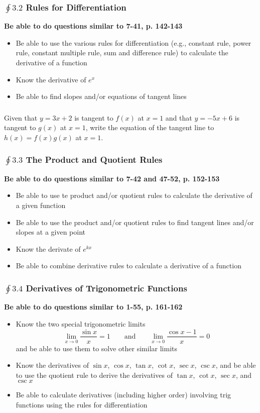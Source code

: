 \documentclass[14pt]{beamer}
\begin{document}
\begin{frame}
\frametitle{\small $\oint 3.2$ Rules for Differentiation}
\small
{\bf Be able to do questions similar to 7-41, p. 142-143}

\begin{itemize}
\item Be able to use the various rules for differentiation (e.g., constant rule, power rule, constant multiple rule, sum and difference rule) to calculate the derivative of a function
\item Know the derivative of $e^x$
\item Be able to find slopes and/or equations of tangent lines
\end{itemize}
\end{frame}

\begin{frame}
\frametitle{}
\begin{exe}
Given that $y=3x+2$ is tangent to $f(x)$ at $x=1$ and that $y=-5x+6$ is tangent to $g(x)$ at $x=1$, write the equation of the tangent line to $h(x)=f(x)g(x)$ at $x=1$.
\end{exe}
\end{frame}

\begin{frame}
\frametitle{\small $\oint 3.3$ The Product and Quotient Rules}
\small
{\bf Be able to do questions similar to 7-42 and 47-52, p. 152-153}

\begin{itemize}
\item Be able to use te product and/or quotient rules to calculate the derivative of a given function
\item Be able to use the product and/or quotient rules to find tangent lines and/or slopes at a given point
\item Know the derivate of $e^{kx}$
\item Be able to combine derivative rules to calculate a derivative of a function
\end{itemize}
\end{frame}

\begin{frame}
\frametitle{\small $\oint 3.4$ Derivatives of Trigonometric Functions}
\footnotesize
{\bf Be able to do questions similar to 1-55, p. 161-162}

\begin{itemize}
\item Know the two special trigonometric limits
\[\lim_{x\to 0}\frac{\sin x}{x}=1\qquad\text{and}\qquad\lim_{x\to 0}\frac{\cos x-1}{x}=0\]
and be able to use them to solve other similar limits
\item Know the derivatives of $\sin x$, $\cos x$, $\tan x$, $\cot x$, $\sec x$, $\csc x$, and be able to use the quotient rule to derive the derivatives of $\tan x$, $\cot x$, $\sec x$, and $\csc x$
\item Be able to calculate derivatives (including higher order) involving trig functions using the rules for differentiation
\end{itemize}
\end{frame}
\end{document}
